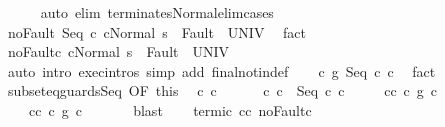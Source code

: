 \begin{isabellebody}
\ \ \ \ \isamarkupfalse%
\ {\isacharparenleft}auto\ elim{\isacharcolon}\ terminates{\isacharunderscore}Normal{\isacharunderscore}elim{\isacharunderscore}cases{\isacharparenright}\isanewline
\ \ \isamarkupfalse%
\ noFault{\isacharcolon}\ {\isachardoublequoteopen}{\isasymGamma}{\isasymturnstile}{\isasymlangle}Seq\ c{}{\isacharprime}\ c{}{\isacharprime}{\isacharcomma}Normal\ s\ {\isasymrangle}\ {\isasymRightarrow}{\isasymnotin}Fault\ {\isacharbackquote}\ UNIV{\isachardoublequoteclose}\ \isamarkupfalse%
\ fact\isanewline
\ \ \isamarkupfalse%
\ noFault{\isacharunderscore}c{}{\isacharprime}{\isacharcolon}\ {\isachardoublequoteopen}{\isasymGamma}{\isasymturnstile}{\isasymlangle}c{}{\isacharprime}{\isacharcomma}Normal\ s\ {\isasymrangle}\ {\isasymRightarrow}{\isasymnotin}Fault\ {\isacharbackquote}\ UNIV{\isachardoublequoteclose}\isanewline
\ \ \ \ \isamarkupfalse%
\ {\isacharparenleft}auto\ intro{\isacharcolon}\ exec{\isachardot}intros\ simp\ add{\isacharcolon}\ final{\isacharunderscore}notin{\isacharunderscore}def{\isacharparenright}\isanewline
\ \ \isamarkupfalse%
\ {\isachardoublequoteopen}c\ {\isasymsubseteq}\isactrlsub g\ Seq\ c{}{\isacharprime}\ c{}{\isacharprime}{\isachardoublequoteclose}\ \isamarkupfalse%
\ fact\isanewline
\ \ \isamarkupfalse%
\ subseteq{\isacharunderscore}guards{\isacharunderscore}Seq\ {\isacharbrackleft}OF\ this{\isacharbrackright}\ \isamarkupfalse%
\ c{}\ c{}\ \ \isanewline
\ \ \ \ c{\isacharcolon}\ {\isachardoublequoteopen}c\ {\isacharequal}\ Seq\ c{}\ c{}{\isachardoublequoteclose}\ \isanewline
\ \ \ \ c{}{\isacharunderscore}c{}{\isacharprime}{\isacharcolon}\ {\isachardoublequoteopen}c{}\ {\isasymsubseteq}\isactrlsub g\ c{}{\isacharprime}{\isachardoublequoteclose}\ \isanewline
\ \ \ \ c{}{\isacharunderscore}c{}{\isacharprime}{\isacharcolon}\ {\isachardoublequoteopen}c{}\ {\isasymsubseteq}\isactrlsub g\ c{}{\isacharprime}{\isachardoublequoteclose}\ \isanewline
\ \ \ \ \isamarkupfalse%
\ blast\isanewline
\ \ \isamarkupfalse%
\ termi{\isacharunderscore}c{}{\isacharprime}\ c{}{\isacharunderscore}c{}{\isacharprime}\ noFault{\isacharunderscore}c{}{\isacharprime}\isanewline

\end{isabellebody}
